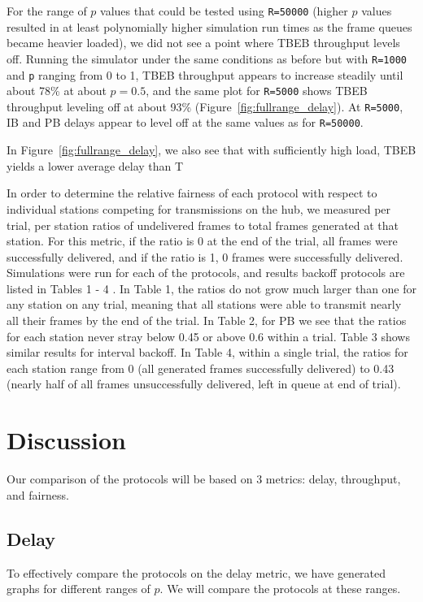 \documentclass[twocolumn]{article}
\begin{document}
For the range of $p$ values that could be tested using \verb|R=50000| (higher
$p$ values resulted in at least polynomially higher simulation run times as the frame queues
became heavier loaded), we did not see a point where TBEB throughput levels off. Running
the simulator under the same conditions as before but with \verb|R=1000| and \verb|p| ranging
from 0 to 1, TBEB throughput appears to increase steadily until about 78\% at about $p = 0.5$,
and the same plot for \verb|R=5000| shows TBEB throughput leveling off at about 93\% 
(Figure~\ref{fig:fullrange_delay}). At \verb|R=5000|, IB and PB delays appear to level off at the
same values as for \verb|R=50000|.

In Figure~\ref{fig:fullrange_delay}, we also see that with sufficiently high load, TBEB yields
a lower average delay than T

In order to determine the relative fairness of each protocol with respect to individual stations
competing for transmissions on the hub, we measured per trial, per station ratios of 
undelivered frames to total frames generated at that station. For this metric, if the ratio
is 0 at the end of the trial, all frames were successfully delivered, and if the ratio is 1, 0
frames were successfully delivered. Simulations were run for
each of the protocols, and results 
backoff protocols are listed in Tables 1 - 4 . In Table 1, the ratios do not grow much larger 
than one for any station on any trial, meaning that all stations were able to transmit
nearly all their frames by the end of the trial. In Table 2, for PB we see that the
ratios for each station never stray below 0.45 or above 0.6 within a trial. Table 3 shows
similar results for interval backoff. In Table 4,
within a single trial, the ratios for each station range from 0 (all generated frames 
successfully delivered) to 0.43 (nearly half of all frames unsuccessfully delivered, left
in queue at end of trial).



\section*{Discussion}
Our comparison of the protocols will be based on 3 metrics: delay, throughput, and fairness.

\subsection*{Delay} To effectively compare the protocols on the delay metric, we have generated
graphs for different ranges of $p$. We will compare the protocols at these ranges.
\end{document}
